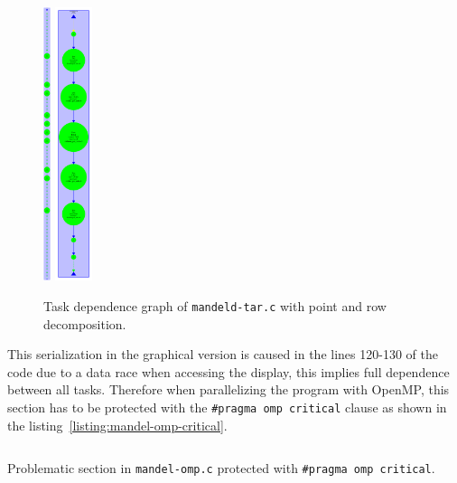 \begin{figure}[H]
\centering
\includegraphics[height=8cm]{plots/dependency_graph_mandeld_point.png}
\hspace{5em}
\includegraphics[height=8cm]{plots/dependency_graph_mandeld_row.pdf}
\caption{Task dependence graph of \texttt{mandeld-tar.c} with point and row decomposition.}
\label{graph:mandeld_point_and_row}
\end{figure}

This serialization in the graphical version is caused in the lines 120-130 of the code due to a data race when accessing the display, this implies full dependence between all tasks. Therefore when parallelizing the program with OpenMP, this section has to be protected with the \texttt{\#pragma omp critical} clause as shown in the listing~\ref{listing:mandel-omp-critical}.

\begin{listing}[H]
\inputminted[firstline=120,lastline=130]{c}{sources/mandel-omp-v1.c}
\caption{Problematic section in \texttt{mandel-omp.c} protected with \texttt{\#pragma omp critical}.}
\label{listing:mandel-omp-critical}
\end{listing}

